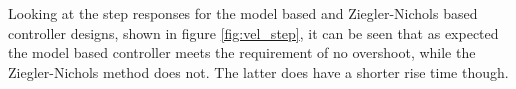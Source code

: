 \documentclass[../../main.tex]{subfiles}
\begin{document}

Looking at the step responses for the model based and Ziegler-Nichols based controller designs, shown in figure \ref{fig:vel_step}, it can be seen that as expected the model based controller meets the requirement of no overshoot, while the Ziegler-Nichols method does not. The latter does have a shorter rise time though.
\end{document}
